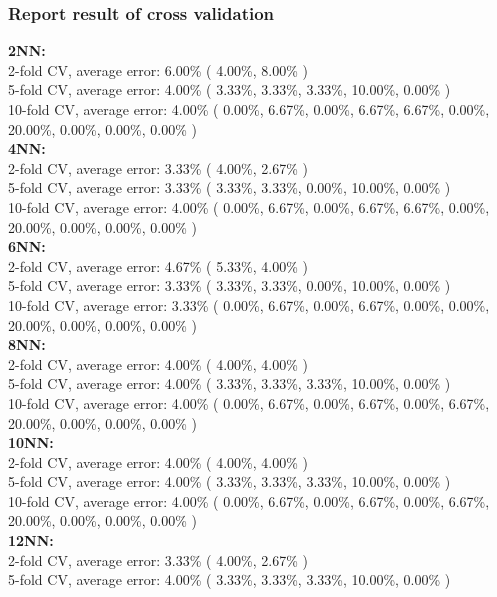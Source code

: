 \documentclass[11pt,a4paper]{article}
\begin{document}
\subsubsection{Report result of cross validation}
\textbf{2NN:} \\
2-fold CV, average error: 6.00\%  ( 4.00\%, 8.00\% )\\
5-fold CV, average error: 4.00\%  ( 3.33\%, 3.33\%, 3.33\%, 10.00\%, 0.00\% )\\
10-fold CV, average error: 4.00\%  ( 0.00\%, 6.67\%, 0.00\%, 6.67\%, 6.67\%, 0.00\%, 20.00\%, 0.00\%, 0.00\%, 0.00\% )\\
\textbf{4NN:} \\
2-fold CV, average error: 3.33\%  ( 4.00\%, 2.67\% )\\
5-fold CV, average error: 3.33\%  ( 3.33\%, 3.33\%, 0.00\%, 10.00\%, 0.00\% )\\
10-fold CV, average error: 4.00\%  ( 0.00\%, 6.67\%, 0.00\%, 6.67\%, 6.67\%, 0.00\%, 20.00\%, 0.00\%, 0.00\%, 0.00\% )\\
\textbf{6NN:} \\
2-fold CV, average error: 4.67\%  ( 5.33\%, 4.00\% )\\
5-fold CV, average error: 3.33\%  ( 3.33\%, 3.33\%, 0.00\%, 10.00\%, 0.00\% )\\
10-fold CV, average error: 3.33\%  ( 0.00\%, 6.67\%, 0.00\%, 6.67\%, 0.00\%, 0.00\%, 20.00\%, 0.00\%, 0.00\%, 0.00\% )\\
\textbf{8NN:} \\
2-fold CV, average error: 4.00\%  ( 4.00\%, 4.00\% )\\
5-fold CV, average error: 4.00\%  ( 3.33\%, 3.33\%, 3.33\%, 10.00\%, 0.00\% )\\
10-fold CV, average error: 4.00\%  ( 0.00\%, 6.67\%, 0.00\%, 6.67\%, 0.00\%, 6.67\%, 20.00\%, 0.00\%, 0.00\%, 0.00\% )\\
\textbf{10NN:} \\
2-fold CV, average error: 4.00\%  ( 4.00\%, 4.00\% )\\
5-fold CV, average error: 4.00\%  ( 3.33\%, 3.33\%, 3.33\%, 10.00\%, 0.00\% )\\
10-fold CV, average error: 4.00\%  ( 0.00\%, 6.67\%, 0.00\%, 6.67\%, 0.00\%, 6.67\%, 20.00\%, 0.00\%, 0.00\%, 0.00\% )\\
\textbf{12NN:} \\
2-fold CV, average error: 3.33\%  ( 4.00\%, 2.67\% )\\
5-fold CV, average error: 4.00\%  ( 3.33\%, 3.33\%, 3.33\%, 10.00\%, 0.00\% )\\
\end{document}
